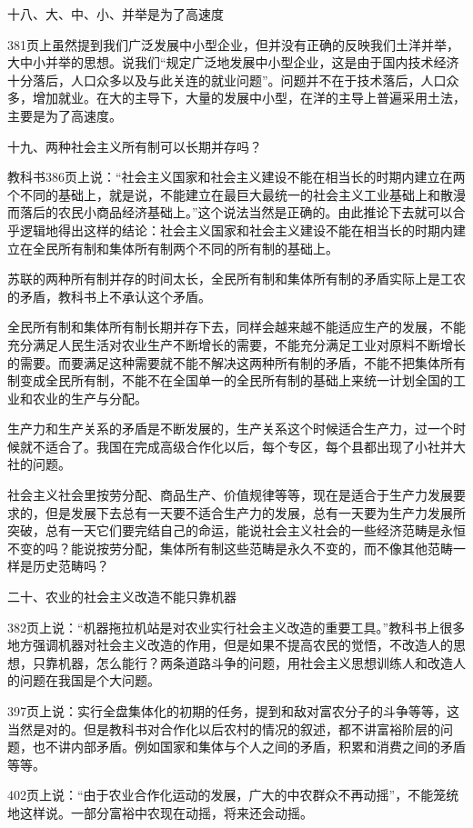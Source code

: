 十八、大、中、小、并举是为了高速度

381页上虽然提到我们广泛发展中小型企业，但并没有正确的反映我们土洋并举，大中小并举的思想。说我们“规定广泛地发展中小型企业，这是由于国内技术经济十分落后，人口众多以及与此关连的就业问题”。问题并不在于技术落后，人口众多，增加就业。在大的主导下，大量的发展中小型，在洋的主导上普遍采用土法，主要是为了高速度。

十九、两种社会主义所有制可以长期并存吗？

教科书386页上说：“社会主义国家和社会主义建设不能在相当长的时期内建立在两个不同的基础上，就是说，不能建立在最巨大最统一的社会主义工业基础上和散漫而落后的农民小商品经济基础上。”这个说法当然是正确的。由此推论下去就可以合乎逻辑地得出这样的结论：社会主义国家和社会主义建设不能在相当长的时期内建立在全民所有制和集体所有制两个不同的所有制的基础上。

苏联的两种所有制并存的时间太长，全民所有制和集体所有制的矛盾实际上是工农的矛盾，教科书上不承认这个矛盾。

全民所有制和集体所有制长期并存下去，同样会越来越不能适应生产的发展，不能充分满足人民生活对农业生产不断增长的需要，不能充分满足工业对原料不断增长的需要。而要满足这种需要就不能不解决这两种所有制的矛盾，不能不把集体所有制变成全民所有制，不能不在全国单一的全民所有制的基础上来统一计划全国的工业和农业的生产与分配。

生产力和生产关系的矛盾是不断发展的，生产关系这个时候适合生产力，过一个时候就不适合了。我国在完成高级合作化以后，每个专区，每个县都出现了小社并大社的问题。

社会主义社会里按劳分配、商品生产、价值规律等等，现在是适合于生产力发展要求的，但是发展下去总有一天要不适合生产力的发展，总有一天要为生产力发展所突破，总有一天它们要完结自己的命运，能说社会主义社会的一些经济范畴是永恒不变的吗？能说按劳分配，集体所有制这些范畴是永久不变的，而不像其他范畴一样是历史范畴吗？

二十、农业的社会主义改造不能只靠机器

382页上说：“机器拖拉机站是对农业实行社会主义改造的重要工具。”教科书上很多地方强调机器对社会主义改造的作用，但是如果不提高农民的觉悟，不改造人的思想，只靠机器，怎么能行？两条道路斗争的问题，用社会主义思想训练人和改造人的问题在我国是个大问题。

397页上说：实行全盘集体化的初期的任务，提到和敌对富农分子的斗争等等，这当然是对的。但是教科书对合作化以后农村的情况的叙述，都不讲富裕阶层的问题，也不讲内部矛盾。例如国家和集体与个人之间的矛盾，积累和消费之间的矛盾等等。

402页上说：“由于农业合作化运动的发展，广大的中农群众不再动摇”，不能笼统地这样说。一部分富裕中农现在动摇，将来还会动摇。

